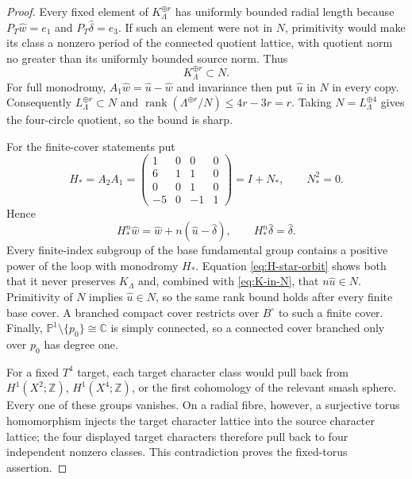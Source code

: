 \documentclass[11pt,letterpaper]{article}
\numberwithin{equation}{section}
\theoremstyle{definition}
\theoremstyle{remark}
\newcommand{\C}{\mathbb C}
\newcommand{\Z}{\mathbb Z}
\newcommand{\rank}{\operatorname{rank}}
\begin{document}
\begin{proof}
Every fixed element of $K_\Lambda^{\oplus r}$ has uniformly bounded radial
length because $P_T\widehat w=e_1$ and
$P_T\widehat\delta=e_3$.  If such an element were not in \(N\),
primitivity would make its class a nonzero period of the connected
quotient lattice, with quotient norm no greater than its uniformly bounded
source norm.  Thus
\begin{equation}
 K_\Lambda^{\oplus r}\subset N.
 \label{eq:K-in-N}
\end{equation}
For full monodromy, $A_1\widehat w=\widehat u-\widehat w$ and invariance
then put $\widehat u$ in $N$ in every copy.  Consequently
$L_\Lambda^{\oplus r}\subset N$ and
$\rank(\Lambda^{\oplus r}/N)\le4r-3r=r$.  Taking
$N=L_\Lambda^{\oplus4}$ gives the four-circle quotient, so the bound is
sharp.

For the finite-cover statements put
\begin{equation}
 H_*=A_2A_1=
 \begin{pmatrix}
 1&0&0&0\\6&1&1&0\\0&0&1&0\\-5&0&-1&1
 \end{pmatrix}=I+N_*,\qquad N_*^2=0.
 \label{eq:H-star}
\end{equation}
Hence
\begin{equation}
 H_*^n\widehat w=\widehat w+n(\widehat u-\widehat\delta),
 \qquad H_*^n\widehat\delta=\widehat\delta.
 \label{eq:H-star-orbit}
\end{equation}
Every finite-index subgroup of the base fundamental group contains a
positive power of the loop with monodromy $H_*$.  Equation
\cref{eq:H-star-orbit} shows both that it never preserves $K_\Lambda$ and,
combined with \cref{eq:K-in-N}, that $n\widehat u\in N$.  Primitivity of
$N$ implies $\widehat u\in N$, so the same rank bound holds after every
finite base cover.  A branched compact cover restricts over $B^\circ$ to
such a finite cover.  Finally,
$\mathbb P^1\setminus\{p_0\}\cong\C$ is simply connected, so a connected
cover branched only over $p_0$ has degree one.

For a fixed $T^4$ target, each target character class would pull back from
$H^1(X^2;\Z)$, $H^1(X^4;\Z)$, or the first cohomology of the relevant
smash sphere.  Every one of these groups vanishes.  On a radial fibre,
however, a surjective torus homomorphism injects the target character
lattice into the source character lattice; the four displayed target
characters therefore pull back to four independent nonzero classes.  This
contradiction proves the fixed-torus assertion.


\end{proof}
\end{document}
